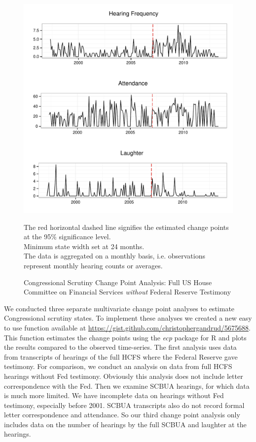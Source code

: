 \documentclass[a4paper]{article}\usepackage[]{graphicx}\usepackage[]{color}
\newenvironment{knitrout}{}{} %
\begin{document}
\begin{figure}
    \caption{Congressional Scrutiny Change Point Analysis: Full US House Committee on Financial Services \emph{without} Federal Reserve Testimony}
    \label{fig:BaseNonFedCP}
\begin{knitrout}
\color{fgcolor}

{\centering \includegraphics[width=0.8\linewidth]{figure/ScrutinyNonFedCP} 

}



\end{knitrout}
{\scriptsize{The red horizontal dashed line signifies the estimated change points at the 95\% significance level.\\
Minimum state width set at 24 months. \\
The data is aggregated on a monthly basis, i.e. observations represent monthly hearing counts or averages.}}
\end{figure}

We conducted three separate multivariate change point analyses to estimate Congressional scrutiny states. To implement these analyses we created a new easy to use function available at \url{https://gist.github.com/christophergandrud/5675688}. This function estimates the change points using the \emph{ecp} \citep{R-ecp} package for R \citep{CiteR} and plots the results compared to the observed time-series. The first analysis uses data from transcripts of hearings of the full HCFS where the Federal Reserve gave testimony. For comparison, we conduct an analysis on data from full HCFS hearings without Fed testimony. Obviously this analysis does not include letter correspondence with the Fed. Then we examine SCBUA hearings, for which data is much more limited. We have incomplete data on hearings without Fed testimony, especially before 2001. SCBUA transcripts also do not record formal letter correspondence and attendance. So our third change point analysis only includes data on the number of hearings by the full SCBUA and laughter at the hearings.
\end{document}
